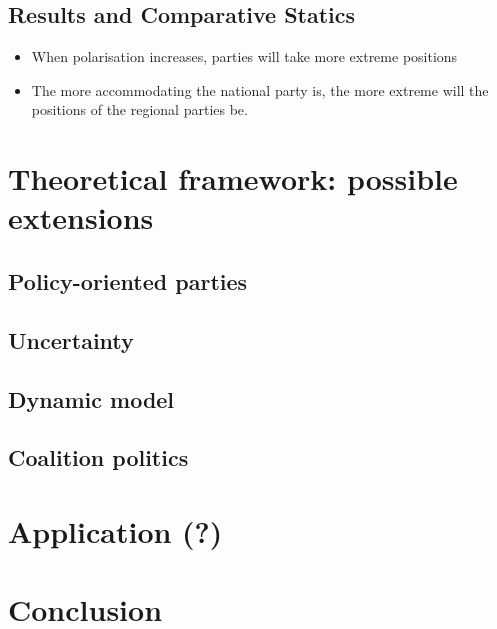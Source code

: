 \documentclass[11pt]{article}
\begin{document}
\subsection{Results and Comparative Statics}

\begin{itemize}
    \item When polarisation increases, parties will take more extreme positions
    \item The more accommodating the national party is, the more extreme will the positions of the regional parties be.
\end{itemize}

\section{Theoretical framework: possible extensions}

\subsection{Policy-oriented parties}

\subsection{Uncertainty}

\subsection{Dynamic model}

\subsection{Coalition politics}

\section{Application (?)}

\section{Conclusion}


\renewcommand*{\mkbibnamefamily}[1]{\textsc{\textbf{#1}}}
\renewcommand*{\mkbibnamegiven}[1]{\textsc{#1}}
\printbibliography
\end{document}
